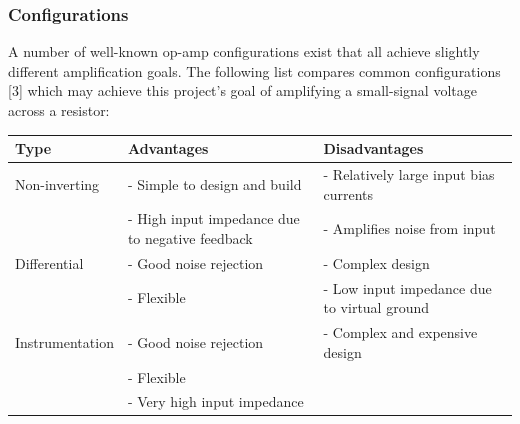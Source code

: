 \subsubsection{Configurations}\label{sec:opamps_configs}
A number of well-known op-amp configurations exist that all achieve slightly different amplification goals. The following list compares common configurations [3] which may achieve this project's goal
of amplifying a small-signal voltage across a resistor:
\begin{center}

    \begin{tabular}{|p{3.5cm}|p{6cm}|p{6cm}|}
        \hline
        Type            & Advantages                                      & Disadvantages                               \\
        \hline
        Non-inverting   & - Simple to design and build                    & - Relatively large input bias currents      \\
                        & - High input impedance due to negative feedback & - Amplifies noise from input                \\
        \hline
        Differential    & - Good noise rejection                          & - Complex design                            \\
                        & - Flexible                                      & - Low input impedance due to virtual ground \\
        \hline
        Instrumentation & - Good noise rejection                          & - Complex and expensive design              \\
                        & - Flexible                                      &                                             \\
                        & - Very high input impedance                     &                                             \\
        \hline
    \end{tabular}
\end{center}

